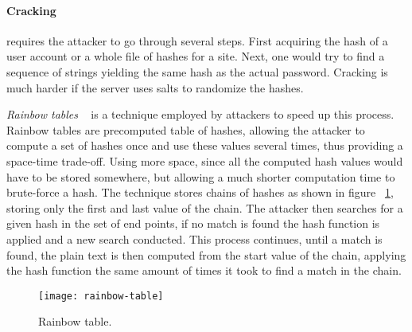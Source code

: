\paragraph{Cracking} requires the attacker to go through several steps. First acquiring the hash of a user account or a whole file of hashes for a site. Next, one would try to find a sequence of strings yielding the same hash as the actual password. Cracking is much harder if the server uses salts to randomize the hashes.
\par \emph{ Rainbow tables }~\cite{rainbow-tables} is a technique employed by attackers to speed up this process. Rainbow tables are precomputed table of hashes, allowing the attacker to compute a set of hashes once and use these values several times, thus providing a space-time trade-off. Using more space, since all the computed hash values would have to be stored somewhere, but allowing a much shorter computation time to brute-force a hash. The technique stores chains of hashes as shown in figure ~\ref{rainbow-table}, storing only the first and last value of the chain. The attacker then searches for a given hash in the set of end points, if no match is found the hash function is applied and a new search conducted. This process continues, until a match is found, the plain text is then computed from the start value of the chain, applying the hash function the same amount of times it took to find a match in the chain. 

\begin{figure}[ht]
    \texttt{[image: rainbow-table]}
    \caption{Rainbow table.}
    \label{rainbow-table}
\end{figure}


